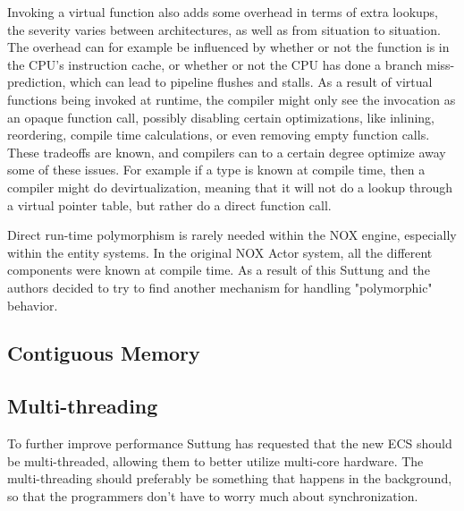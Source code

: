 Invoking a virtual function also adds some overhead in terms of extra lookups, the severity varies between architectures,
as well as from situation to situation.
The overhead can for example be influenced by whether or not the function is in the CPU's instruction cache,
or whether or not the CPU has done a branch miss-prediction, which can lead to pipeline flushes and stalls\cite{scott_meyers_cpu_caches_and_why_you_care}\cite[Data Locality]{game_programming_patterns}.
As a result of virtual functions being invoked at runtime, the compiler might only see the invocation as an opaque function call,
possibly disabling certain optimizations, like inlining, reordering, compile time calculations, or even removing empty function calls. 
These tradeoffs are known, and compilers can to a certain degree optimize away some of these issues.
For example if a type is known at compile time, then a compiler might do devirtualization,
meaning that it will not do a lookup through a virtual pointer table, but rather do a direct function call\cite{lazarenko_devirtualization}.

Direct run-time polymorphism is rarely needed within the NOX engine, especially within the entity systems.
In the original NOX Actor system, all the different components were known at compile time.
As a result of this Suttung and the authors decided to try to find another mechanism for handling "polymorphic" behavior.

\subsection{Contiguous Memory}
\label{subsec:requirements_performance_contiguous_memory}


\subsection{Multi-threading}
\label{subsec:requirements_performance_multi_threading}
To further improve performance Suttung has requested that the new ECS should be multi-threaded, allowing them to better utilize multi-core hardware.
The multi-threading should preferably be something that happens in the background, so that the programmers don't have to worry much about synchronization.
